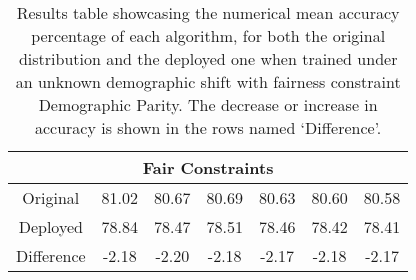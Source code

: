 \begin{table}[ht]
\begin{tabular}{|c|cccccc|}
\multicolumn{7}{|c|}{Fair Constraints} \\ \hline 
Original & 81.02 & 80.67 & 80.69 & 80.63 & 80.60 & 80.58 \\ \hline
Deployed & 78.84 & 78.47 & 78.51 & 78.46 & 78.42 & 78.41 \\ \hline
Difference & -2.18 & -2.20 & -2.18 & -2.17 & -2.18 & -2.17 \\ \hline
\end{tabular}
\caption{Results table showcasing the numerical mean accuracy percentage of each algorithm, for both the original distribution and the deployed one when trained under an unknown demographic shift with fairness constraint Demographic Parity. The decrease or increase in accuracy is shown in the rows named `Difference'.}
\label{tab:uci_num_unk_DP}
\end{table}

